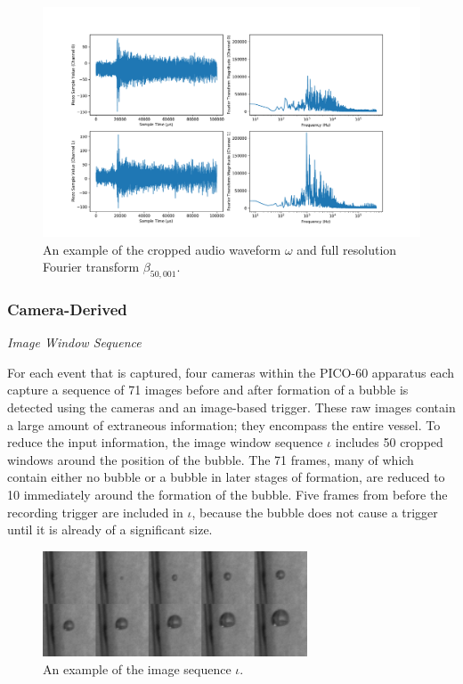 \documentclass[10pt]{article}
\begin{document}
\begin{figure}[h]
    \centering
    \includegraphics[width=\textwidth]{audio}
    \caption{\label{} An example of the cropped audio waveform $\omega$ and full resolution Fourier transform $\beta_{50,001}$.}
\end{figure}

\subsubsection{Camera-Derived}

\textit{Image Window Sequence}

For each event that is captured, four cameras within the PICO-60 apparatus each capture a sequence of 71 images before and after formation of a bubble is detected using the cameras and an image-based trigger. These raw images contain a large amount of extraneous information; they encompass the entire vessel. To reduce the input information, the image window sequence $\iota$ includes 50 cropped windows around the position of the bubble. The 71 frames, many of which contain either no bubble or a bubble in later stages of formation, are reduced to 10 immediately around the formation of the bubble. Five frames from before the recording trigger are included in $\iota$, because the bubble does not cause a trigger until it is already of a significant size.

\begin{figure}[h]
    \centering
    \includegraphics[width=0.7\textwidth]{image_grid}
    \caption{\label{} An example of the image sequence $\iota$.}
\end{figure}
\end{document}
